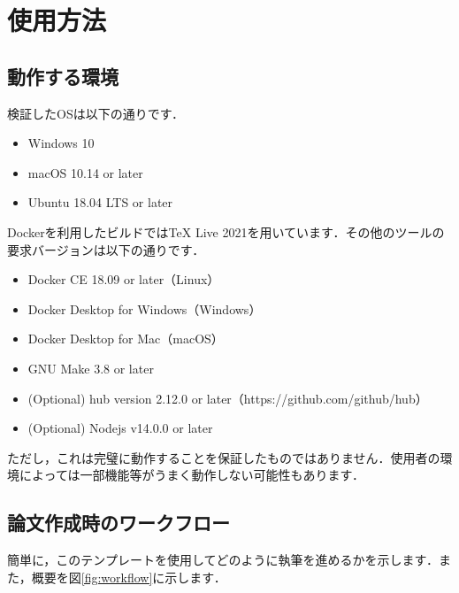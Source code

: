 \documentclass[main]{subfiles}
\begin{document}
\section{使用方法}

\subsection{動作する環境}

検証したOSは以下の通りです．

\begin{itemize}
    \item Windows 10
    \item macOS 10.14 or later
    \item Ubuntu 18.04 LTS or later
\end{itemize}

Dockerを利用したビルドではTeX Live 2021を用いています．その他のツールの要求バージョンは以下の通りです．

\begin{itemize}
    \item Docker CE 18.09 or later（Linux）
    \item Docker Desktop for Windows（Windows）
    \item Docker Desktop for Mac（macOS）
    \item GNU Make 3.8 or later
    \item (Optional) hub version 2.12.0 or later（https://github.com/github/hub）
    \item (Optional) Nodejs v14.0.0 or later
\end{itemize}

ただし，これは完璧に動作することを保証したものではありません．使用者の環境によっては一部機能等がうまく動作しない可能性もあります．

\subsection{論文作成時のワークフロー}

簡単に，このテンプレートを使用してどのように執筆を進めるかを示します．また，概要を図\ref{fig:workflow}に示します．
\end{document}
